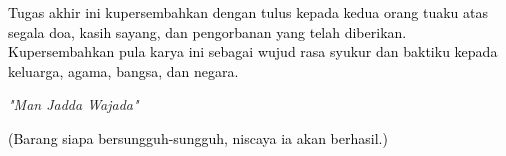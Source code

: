 \vspace{7cm}

\begin{center}
	\textcolor{black}{Tugas akhir ini kupersembahkan dengan tulus kepada kedua orang tuaku atas segala doa, kasih sayang, dan pengorbanan yang telah diberikan. Kupersembahkan pula karya ini sebagai wujud rasa syukur dan baktiku kepada keluarga, agama, bangsa, dan negara.}

	\vspace{1cm}

	\textit{"Man Jadda Wajada"}

	\textcolor{black}{(Barang siapa bersungguh-sungguh, niscaya ia akan berhasil.)}
\end{center}

